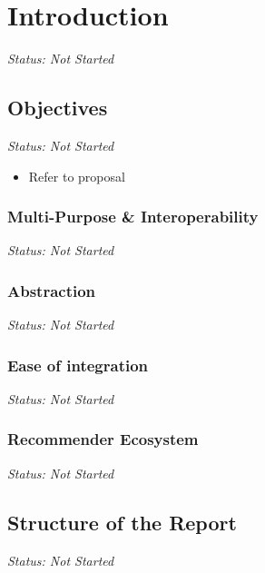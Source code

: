\chapter{Introduction}

\emph{Status: Not Started}

\section{Objectives}

\emph{Status: Not Started}

\begin{itemize}
\item Refer to proposal
\end{itemize}

\subsection{Multi-Purpose \& Interoperability}

\emph{Status: Not Started}

\subsection{Abstraction}

\emph{Status: Not Started}

\subsection{Ease of integration}

\emph{Status: Not Started}

\subsection{Recommender Ecosystem}

\emph{Status: Not Started}

\section{Structure of the Report}

\emph{Status: Not Started}